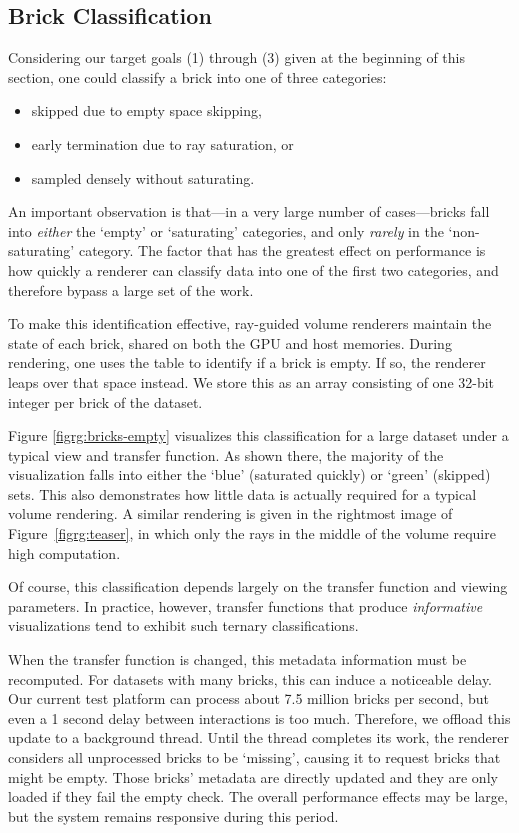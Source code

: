 \subsection{Brick Classification}
\label{sec:brick-classification}

Considering our target goals (1) through (3) given at the beginning of
this section, one could classify a brick into one of three categories:
\begin{itemize}
  \itemsep0em
  \item skipped due to empty space skipping,

  \item early termination due to ray saturation, or

  \item sampled densely without saturating.
\end{itemize}

An important observation is that---in a very large number of
cases---bricks fall into \emph{either} the `empty' or `saturating'
categories, and only \emph{rarely} in the `non-saturating' category.
The factor that has the greatest effect on performance is how quickly
a renderer can classify data into one of the first two categories, and
therefore bypass a large set of the work.

To make this identification effective, ray-guided volume renderers
maintain the state of each brick, shared on both the GPU and host
memories.  During rendering, one uses the table to identify if a brick
is empty.  If so, the renderer leaps over that space instead.  We store
this as an array consisting of one 32-bit integer per brick of the
dataset.

Figure \ref{figrg:bricks-empty} visualizes this classification for a
large dataset under a typical view and transfer function.  As shown
there, the majority of the visualization falls into either the `blue'
(saturated quickly) or `green' (skipped) sets. This also demonstrates
how little data is actually required for a typical volume rendering.  A
similar rendering is given in the rightmost image of
Figure~\ref{figrg:teaser}, in which only the rays in the middle of the
volume require high computation.

Of course, this classification depends largely on the transfer function
and viewing parameters.  In practice, however, transfer functions that
produce \emph{informative} visualizations tend to exhibit such ternary
classifications.

When the transfer function is changed, this metadata information
must be recomputed.  For datasets with many bricks, this can induce
a noticeable delay.  Our current test platform can process about
7.5 million bricks per second, but even a 1 second delay between
interactions is too much.  Therefore, we offload this update to a
background thread.  Until the thread completes its work, the renderer
considers all unprocessed bricks to be `missing', causing it to request
bricks that might be empty.  Those bricks' metadata are directly
updated and they are only loaded if they fail the empty check.  The
overall performance effects may be large, but the system remains
responsive during this period.

